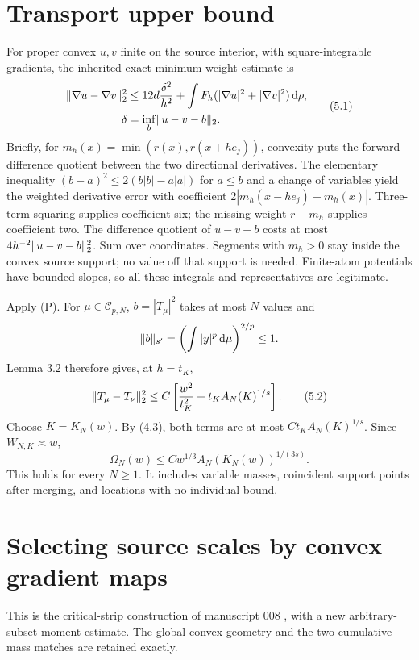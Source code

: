 \section{Transport upper bound}
For proper convex $u,v$ finite on the source interior, with square-integrable gradients, the inherited exact minimum-weight estimate is
\begin{equation}
 \begin{split}
 \lVert\nabla u-\nabla v\rVert_2^2
 &\le12d\frac{\delta^2}{h^2}
 +\int F_h(|\nabla u|^2+|\nabla v|^2)\,\mathrm d\rho,\\
 \delta&=\inf_b\lVert u-v-b\rVert_2.
 \end{split}\tag{5.1}
\end{equation}
Briefly, for $m_h(x)=\min(r(x),r(x+he_j))$, convexity puts the forward difference quotient between the two directional derivatives. The elementary inequality $(b-a)^2\le2(b|b|-a|a|)$ for $a\le b$ and a change of variables yield the weighted derivative error with coefficient $2|m_h(x-he_j)-m_h(x)|$. Three-term squaring supplies coefficient six; the missing weight $r-m_h$ supplies coefficient two. The difference quotient of $u-v-b$ costs at most $4h^{-2}\lVert u-v-b\rVert_2^2$. Sum over coordinates. Segments with $m_h>0$ stay inside the convex source support; no value off that support is needed. Finite-atom potentials have bounded slopes, so all these integrals and representatives are legitimate.

Apply (P). For $\mu\in\mathcal C_{p,N}$, $b=|T_\mu|^2$ takes at most $N$ values and
\[
 \lVert b\rVert_{s'}=\left(\int|y|^p\,\mathrm d\mu\right)^{2/p}\le1.
\]
Lemma 3.2 therefore gives, at $h=t_K$,
\begin{equation}
 \lVert T_\mu-T_\nu\rVert_2^2\le C\left[\frac{w^2}{t_K^2}+t_KA_N(K)^{1/s}\right].\tag{5.2}
\end{equation}
Choose $K=K_N(w)$. By (4.3), both terms are at most $Ct_KA_N(K)^{1/s}$. Since $W_{N,K}\asymp w$,
\begin{equation}
 \Omega_N(w)\le Cw^{1/3}A_N(K_N(w))^{1/(3s)}.\tag{5.3}
\end{equation}
This holds for every $N\ge1$. It includes variable masses, coincident support points after merging, and locations with no individual bound.

\section{Selecting source scales by convex gradient maps}
This is the critical-strip construction of manuscript 008 \cite{phase}, with a new arbitrary-subset moment estimate. The global convex geometry and the two cumulative mass matches are retained exactly.

